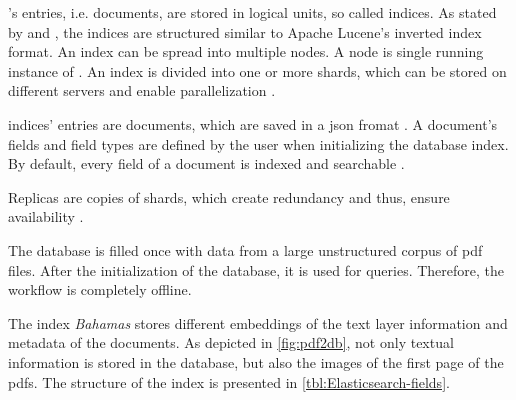 \databaseName{}'s entries, i.e. documents, are stored in logical units, so called indices.
As stated by \citeauthor{Elasticsearch2019} and \citeauthor{Elasticsearch2017}, the indices are structured similar to Apache Lucene's inverted index format.
An index can be spread into multiple nodes.
A node is single running instance of \databaseName{} \cite{Elasticsearch2019}.
An index is divided into one or more shards, which can be stored on different servers and enable parallelization \cite{Elasticsearch2019}.

\databaseName{} indices' entries are documents, which are saved in a \ac{json} fromat \cite{Elasticsearch2017}.
A document's fields and field types are defined by the user when initializing the database index.
By default, every field of a document is indexed and searchable \cite{Elasticsearch2019}.

Replicas are copies of shards, which create redundancy and thus, ensure availability \cite{Elasticsearch2019}.

The database is filled once with data from a large unstructured corpus of \ac{pdf} files.
After the initialization of the database, it is used for queries. 
Therefore, the workflow is completely offline.

The index \textit{Bahamas} stores different embeddings of the text layer information and metadata of the documents.
As depicted in \autoref{fig:pdf2db}, not only textual information is stored in the database, but also the images of the first page of the \acp{pdf}.
The structure of the index is presented in \autoref{tbl:Elasticsearch-fields}.

